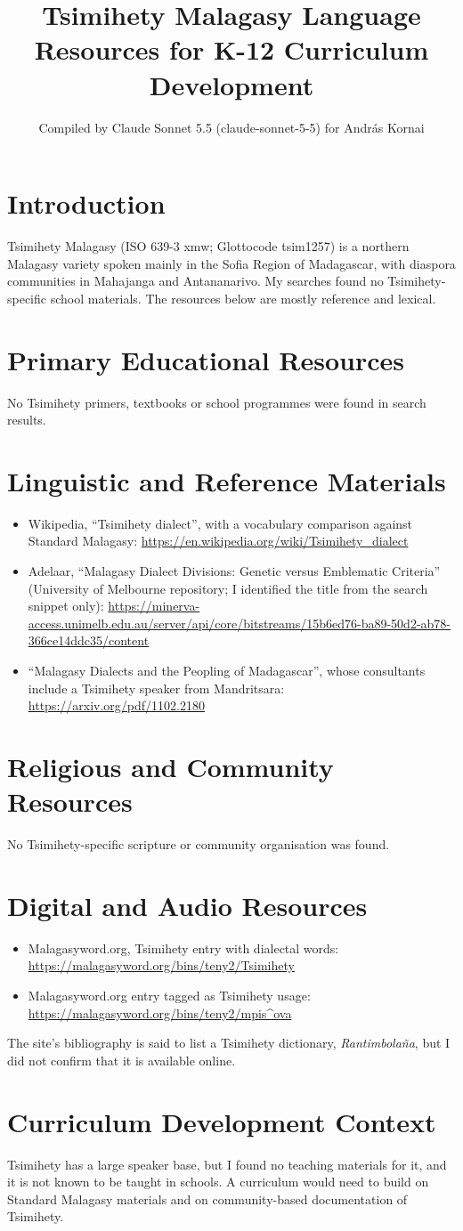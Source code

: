 \documentclass[12pt]{article}
\title{Tsimihety Malagasy Language Resources for K-12 Curriculum Development}
\author{Compiled by Claude Sonnet 5.5 (claude-sonnet-5-5) for Andr\'as Kornai}
\date{}
\begin{document}
\maketitle

\section{Introduction}
Tsimihety Malagasy (ISO 639-3 xmw; Glottocode tsim1257) is a northern Malagasy variety spoken mainly in the Sofia Region of Madagascar, with diaspora communities in Mahajanga and Antananarivo. My searches found no Tsimihety-specific school materials. The resources below are mostly reference and lexical.

\section{Primary Educational Resources}
No Tsimihety primers, textbooks or school programmes were found in search results.

\section{Linguistic and Reference Materials}
\begin{itemize}
\item Wikipedia, ``Tsimihety dialect'', with a vocabulary comparison against Standard Malagasy: \url{https://en.wikipedia.org/wiki/Tsimihety_dialect}
\item Adelaar, ``Malagasy Dialect Divisions: Genetic versus Emblematic Criteria'' (University of Melbourne repository; I identified the title from the search snippet only): \url{https://minerva-access.unimelb.edu.au/server/api/core/bitstreams/15b6ed76-ba89-50d2-ab78-366ce14ddc35/content}
\item ``Malagasy Dialects and the Peopling of Madagascar'', whose consultants include a Tsimihety speaker from Mandritsara: \url{https://arxiv.org/pdf/1102.2180}
\end{itemize}

\section{Religious and Community Resources}
No Tsimihety-specific scripture or community organisation was found.

\section{Digital and Audio Resources}
\begin{itemize}
\item Malagasyword.org, Tsimihety entry with dialectal words: \url{https://malagasyword.org/bins/teny2/Tsimihety}
\item Malagasyword.org entry tagged as Tsimihety usage: \url{https://malagasyword.org/bins/teny2/mpis\^ova}
\end{itemize}
The site's bibliography is said to list a Tsimihety dictionary, \emph{Rantimbola\~na}, but I did not confirm that it is available online.

\section{Curriculum Development Context}
Tsimihety has a large speaker base, but I found no teaching materials for it, and it is not known to be taught in schools. A curriculum would need to build on Standard Malagasy materials and on community-based documentation of Tsimihety.
\end{document}
